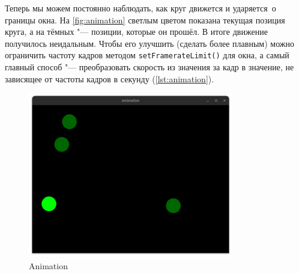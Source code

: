 Теперь мы можем постоянно наблюдать, как круг движется и \flqq ударяется\frqq\ о границы окна. На \autoref{fig:animation} светлым цветом показана текущая позиция круга, а на тёмных "--- позиции, которые он прошёл. В итоге движение получилось неидальным. Чтобы его улучшить (сделать более плавным) можно ограничить частоту кадров методом \texttt{setFramerateLimit()} для окна, а самый главный способ "--- преобразовать скорость из значения за кадр в значение, не зависящее от частоты кадров в секунду (\autoref{lst:animation}).
\begin{figure}[H]
    \centering
    \includegraphics[width=0.8\textwidth]{src/img/sfml_animation.png}
    \caption{Animation}
    \label{fig:animation}
\end{figure}